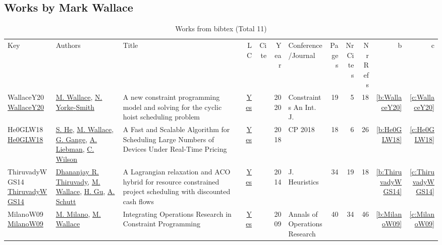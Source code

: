\subsection{Works by Mark Wallace}
\label{sec:a117}
{\scriptsize
\begin{longtable}{>{\raggedright\arraybackslash}p{3cm}>{\raggedright\arraybackslash}p{6cm}>{\raggedright\arraybackslash}p{6.5cm}rrrp{2.5cm}rrrrr}
\rowcolor{white}\caption{Works from bibtex (Total 11)}\\ \toprule
\rowcolor{white}Key & Authors & Title & LC & Cite & Year & \shortstack{Conference\\/Journal} & Pages & \shortstack{Nr\\Cites} & \shortstack{Nr\\Refs} & b & c \\ \midrule\endhead
\bottomrule
\endfoot
WallaceY20 \href{https://doi.org/10.1007/s10601-020-09316-z}{WallaceY20} & \hyperref[auth:a117]{M. Wallace}, \hyperref[auth:a19]{N. Yorke{-}Smith} & A new constraint programming model and solving for the cyclic hoist scheduling problem & \href{works/WallaceY20.pdf}{Yes} & \cite{WallaceY20} & 2020 & Constraints An Int. J. & 19 & 5 & 18 & \ref{b:WallaceY20} & \ref{c:WallaceY20}\\
He0GLW18 \href{https://doi.org/10.1007/978-3-319-98334-9\_42}{He0GLW18} & \hyperref[auth:a186]{S. He}, \hyperref[auth:a117]{M. Wallace}, \hyperref[auth:a187]{G. Gange}, \hyperref[auth:a188]{A. Liebman}, \hyperref[auth:a189]{C. Wilson} & A Fast and Scalable Algorithm for Scheduling Large Numbers of Devices Under Real-Time Pricing & \href{works/He0GLW18.pdf}{Yes} & \cite{He0GLW18} & 2018 & CP 2018 & 18 & 6 & 26 & \ref{b:He0GLW18} & \ref{c:He0GLW18}\\
ThiruvadyWGS14 \href{https://doi.org/10.1007/s10732-014-9260-3}{ThiruvadyWGS14} & \hyperref[auth:a402]{Dhananjay R. Thiruvady}, \hyperref[auth:a117]{M. Wallace}, \hyperref[auth:a342]{H. Gu}, \hyperref[auth:a125]{A. Schutt} & A Lagrangian relaxation and {ACO} hybrid for resource constrained project scheduling with discounted cash flows & \href{works/ThiruvadyWGS14.pdf}{Yes} & \cite{ThiruvadyWGS14} & 2014 & J. Heuristics & 34 & 19 & 18 & \ref{b:ThiruvadyWGS14} & \ref{c:ThiruvadyWGS14}\\
MilanoW09 \href{http://dx.doi.org/10.1007/s10479-009-0654-9}{MilanoW09} & \hyperref[auth:a144]{M. Milano}, \hyperref[auth:a117]{M. Wallace} & Integrating Operations Research in Constraint Programming & \href{works/MilanoW09.pdf}{Yes} & \cite{MilanoW09} & 2009 & Annals of Operations Research & 40 & 34 & 46 & \ref{b:MilanoW09} & \ref{c:MilanoW09}\\

\end{longtable}}
